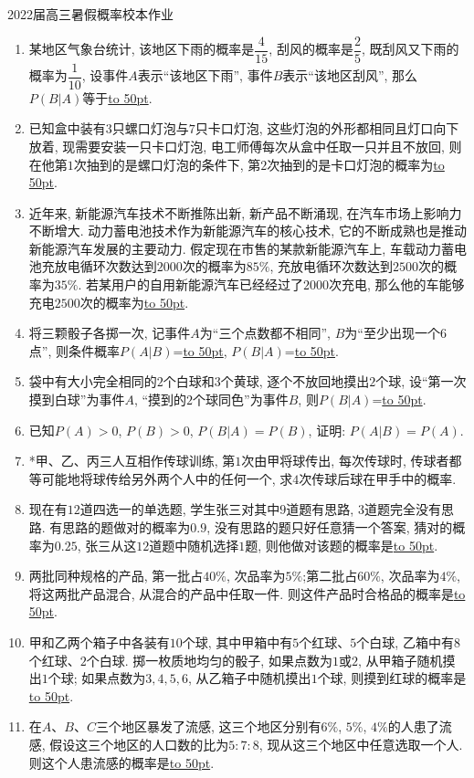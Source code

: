 \documentclass[10pt,a4paper]{article}
\newcommand{\blank}[1]{\underline{\hbox to #1pt{}}}
\begin{document}
2022届高三暑假概率校本作业

\begin{enumerate}[1.]
\item 某地区气象台统计, 该地区下雨的概率是$\dfrac 4{15}$, 刮风的概率是$\dfrac 25$, 既刮风又下雨的概率为$\dfrac 1{10}$, 设事件$A$表示``该地区下雨'', 事件$B$表示``该地区刮风'', 那么$P(B|A)$等于\blank{50}.
\item 已知盒中装有$3$只螺口灯泡与$7$只卡口灯泡, 这些灯泡的外形都相同且灯口向下放着, 现需要安装一只卡口灯泡, 电工师傅每次从盒中任取一只并且不放回, 则在他第$1$次抽到的是螺口灯泡的条件下, 第$2$次抽到的是卡口灯泡的概率为\blank{50}.
\item 近年来, 新能源汽车技术不断推陈出新, 新产品不断涌现, 在汽车市场上影响力不断增大. 动力蓄电池技术作为新能源汽车的核心技术, 它的不断成熟也是推动新能源汽车发展的主要动力. 假定现在市售的某款新能源汽车上, 车载动力蓄电池充放电循环次数达到$2000$次的概率为$85\%$, 充放电循环次数达到$2500$次的概率为$35\%$. 若某用户的自用新能源汽车已经经过了$2000$次充电, 那么他的车能够充电$2500$次的概率为\blank{50}.
\item 将三颗骰子各掷一次, 记事件$A$为``三个点数都不相同'', $B$为``至少出现一个$6$点'', 则条件概率$P(A|B)$=\blank{50}, $P(B|A)$=\blank{50}.
\item 袋中有大小完全相同的$2$个白球和$3$个黄球, 逐个不放回地摸出$2$个球, 设``第一次摸到白球''为事件$A$, ``摸到的$2$个球同色''为事件$B$, 则$P(B|A)$=\blank{50}.
\item 已知$P(A)>0$, $P(B)>0$, $P(B|A)=P(B)$, 证明: $P(A|B)=P(A)$.
\item *甲、乙、丙三人互相作传球训练, 第$1$次由甲将球传出, 每次传球时, 传球者都等可能地将球传给另外两个人中的任何一个, 求$4$次传球后球在甲手中的概率.
\item 现在有$12$道四选一的单选题, 学生张三对其中$9$道题有思路, $3$道题完全没有思路. 有思路的题做对的概率为$0.9$, 没有思路的题只好任意猜一个答案, 猜对的概率为$0.25$, 张三从这$12$道题中随机选择$1$题, 则他做对该题的概率是\blank{50}.
\item 两批同种规格的产品, 第一批占$40\%$, 次品率为$5\%$;第二批占$60\%$, 次品率为$4\%$, 将这两批产品混合, 从混合的产品中任取一件. 则这件产品时合格品的概率是\blank{50}.
\item 甲和乙两个箱子中各装有$10$个球, 其中甲箱中有$5$个红球、$5$个白球, 乙箱中有$8$个红球、$2$个白球. 掷一枚质地均匀的骰子, 如果点数为$1$或$2$, 从甲箱子随机摸出$1$个球; 如果点数为$3, 4, 5, 6$, 从乙箱子中随机摸出$1$个球, 则摸到红球的概率是\blank{50}.
\item 在$A$、$B$、$C$三个地区暴发了流感, 这三个地区分别有$6\%$, $5\%$, $4\%$的人患了流感, 假设这三个地区的人口数的比为$5: 7: 8$, 现从这三个地区中任意选取一个人. 则这个人患流感的概率是\blank{50}.

\end{enumerate}
\end{document}
